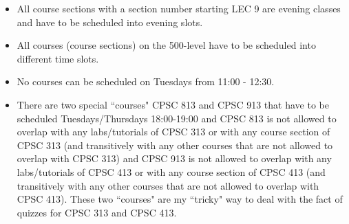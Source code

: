 \documentclass[11pt, oneside]{article}   	%
\begin{document}
\begin{itemize}[topsep=0pt, itemsep=0pt]
\begin{itemize}[topsep=0pt, itemsep=0pt]
    \item All course sections with a section number starting LEC 9 are evening classes and have to be scheduled into evening slots.
    \item All courses (course sections) on the 500-level have to be scheduled into different time slots.
    \item No courses can be scheduled on Tuesdays from 11:00 - 12:30.
    \item There are two special ``courses" CPSC 813 and CPSC 913 that have to be scheduled Tuesdays/Thursdays 18:00-19:00 and CPSC 813 is not allowed to overlap with any labs/tutorials of CPSC 313 or with any course section of CPSC 313 (and transitively with any other courses that are not allowed to overlap with CPSC 313) and CPSC 913 is not allowed to overlap with any labs/tutorials of CPSC 413 or with any course section of CPSC 413 (and transitively with any other courses that are not allowed to overlap with CPSC 413). These two ``courses" are my ``tricky" way to deal with the fact of quizzes for CPSC 313 and CPSC 413.
    \end{itemize}
\end{itemize}
\end{document}
